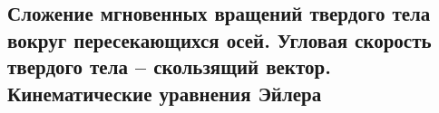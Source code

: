 

\subsection{Сложение мгновенных вращений твердого тела вокруг пересекающихся осей. Угловая скорость твердого тела -- скользящий вектор. Кинематические уравнения Эйлера}



